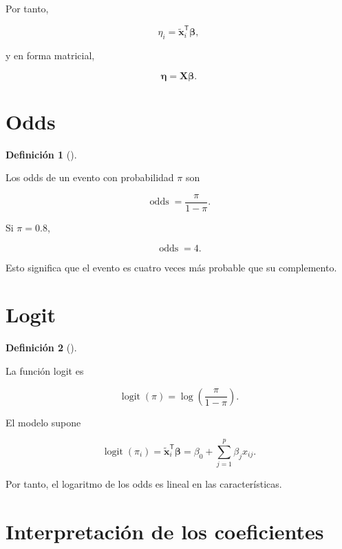 \documentclass[
  spanish,
  10.5pt,
  letterpaper,
  DIV=11,
  numbers=noendperiod,
  oneside,
  open=any]{scrreprt}
\theoremstyle{definition}
\newtheorem{definition}{Definición}[chapter]
\theoremstyle{definition}
\theoremstyle{plain}
\theoremstyle{remark}
\begin{document}
Por tanto,

\[
\eta_i
=
\widetilde{\mathbf{x}}_i^{\mathsf T}
\boldsymbol{\beta},
\]

y en forma matricial,

\[
\boldsymbol{\eta}
=
\mathbf{X}\boldsymbol{\beta}.
\]

\section*{Odds}\label{odds}


\begin{definition}[]\protect\hypertarget{def-odds}{}\label{def-odds}

Los odds de un evento con probabilidad \(\pi\) son

\[
\operatorname{odds}
=
\frac{\pi}{1-\pi}.
\]

\end{definition}

Si \(\pi=0.8\),

\[
\operatorname{odds}=4.
\]

Esto significa que el evento es cuatro veces más probable que su
complemento.

\section*{Logit}\label{logit}


\begin{definition}[]\protect\hypertarget{def-logit}{}\label{def-logit}

La función logit es

\[
\operatorname{logit}(\pi)
=
\log\left(\frac{\pi}{1-\pi}\right).
\]

\end{definition}

El modelo supone

\[
\operatorname{logit}(\pi_i)
=
\widetilde{\mathbf{x}}_i^{\mathsf T}
\boldsymbol{\beta}
=
\beta_0+
\sum_{j=1}^{p}\beta_j x_{ij}.
\]

Por tanto, el logaritmo de los odds es lineal en las características.

\section*{Interpretación de los
coeficientes}\label{interpretaciuxf3n-de-los-coeficientes-1}
\end{document}
